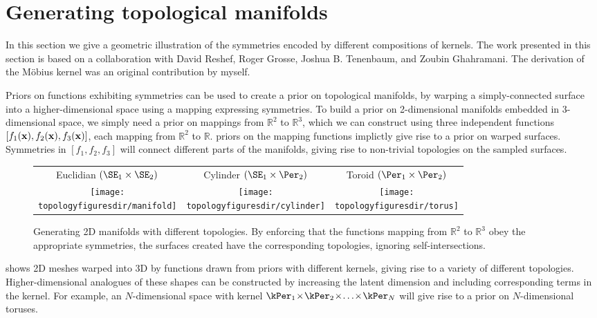 \section{Generating topological manifolds}
\label{sec:topological-manifolds}

In this section we give a geometric illustration of the symmetries encoded by different compositions of kernels.
The work presented in this section is based on a collaboration with David Reshef, Roger Grosse, Joshua B. Tenenbaum, and Zoubin Ghahramani.
The derivation of the M\"obius kernel was an original contribution by myself.

Priors on functions exhibiting symmetries can be used to create a prior on topological manifolds, by warping a simply-connected surface into a higher-dimensional space using a mapping expressing symmetries. %
To build a prior on 2-dimensional manifolds embedded in 3-dimensional space, we simply need a prior on mappings from $\mathbb{R}^2$ to $\mathbb{R}^3$, which we can construct using three independent functions $[f_1({\bf{x}}), f_2({\bf{x}}), f_3({\bf{x}})]$, each mapping from $\mathbb{R}^2$ to $\mathbb{R}$.
\gp{} priors on the mapping functions implictly give rise to a prior on warped surfaces.
Symmetries in $[f_1, f_2, f_3]$ will connect different parts of the manifolds, giving rise to non-trivial topologies on the sampled surfaces.
%
\begin{figure}
\renewcommand{\tabcolsep}{1mm}
\begin{tabular}{ccc}
Euclidian $( \SE_1 \times \SE_2 )$  & Cylinder $( \SE_1 \times \Per_2 )$ & Toroid $( \Per_1 \times \Per_2 )$\\
\hspace{-0.5cm}\texttt{[image: \\topologyfiguresdir/manifold]} &
\texttt{[image: \\topologyfiguresdir/cylinder]} &
\texttt{[image: \\topologyfiguresdir/torus]} \\
\end{tabular}
\caption[Generating 2D manifolds with different topological structures]{
Generating 2D manifolds with different topologies.
By enforcing that the functions mapping from $\mathbb{R}^2$ to $\mathbb{R}^3$ obey the appropriate symmetries, the surfaces created have the corresponding topologies, ignoring self-intersections.
}
\label{fig:gen_surf}
\end{figure}
%
 shows 2D meshes warped into 3D by functions drawn from \gp{} priors with different kernels, giving rise to a variety of different topologies.
%
Higher-dimensional analogues of these shapes can be constructed by increasing the latent dimension and including corresponding terms in the kernel.
For example, an $N$-dimensional space with kernel $\kPer_1 \kerntimes \kPer_2 \kerntimes \ldots \kerntimes \kPer_N$ will give rise to a prior on $N$-dimensional toruses.

